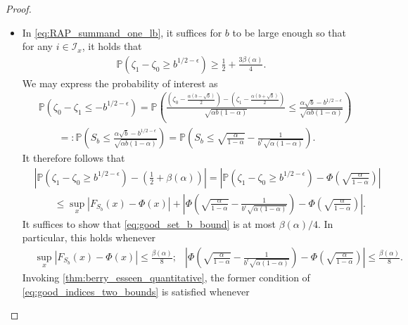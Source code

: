 \documentclass[11pt]{amsart}
\numberwithin{equation}{section}
\numberwithin{equation}{section}
\newcommand{\1}{\mathbbm{1}}
\newcommand{\Prob}{\mathbb{P}}
\theoremstyle{definition}
\begin{document}
\begin{appendices}
\begin{proof}
\begin{itemize}
        \item In \eqref{eq:RAP_summand_one_lb}, it suffices for $b$ to be large enough so that for any $i \in \mathcal I_x$, it holds that
        \begin{align*}
            \Prob\left( \zeta_1 - \zeta_0 \geq b^{1/2-\epsilon} \right) \geq \frac{1}{2} + \frac{3\beta(\alpha)}{4}.
        \end{align*}
        We may express the probability of interest as
        \begin{align*}
            & \Prob\left( \zeta_0 - \zeta_1 \leq -b^{1/2-\epsilon} \right) = \Prob\left( \frac{\left( \zeta_0-\frac{\alpha(b-\sqrt{b})}{2} \right) - \left( \zeta_1-\frac{\alpha(b+\sqrt{b})}{2} \right)}{\sqrt{\alpha b (1-\alpha)}} \leq \frac{\alpha \sqrt{b} - b^{1/2-\epsilon}}{\sqrt{\alpha b (1-\alpha)}} \right) \\
            & \qquad =: \Prob\left( S_b \leq \frac{\alpha \sqrt{b} - b^{1/2-\epsilon}}{\sqrt{\alpha b (1-\alpha)}} \right) = \Prob\left( S_b \leq \sqrt{\frac{\alpha}{1-\alpha}} - \frac{1}{b^\epsilon \sqrt{\alpha(1-\alpha)}} \right).
        \end{align*}
        It therefore follows that
        \begin{align}
            & \left| \Prob\left( \zeta_1 - \zeta_0 \geq b^{1/2-\epsilon} \right) - \left(\frac{1}{2} + \beta(\alpha) \right) \right| = \left| \Prob\left( \zeta_1 - \zeta_0 \geq b^{1/2-\epsilon} \right) - \Phi\left( \sqrt{\frac{\alpha}{1-\alpha}} \right) \right| \nonumber \\
            & \qquad \leq \sup_x |F_{S_b}(x) - \Phi(x)| + \left| \Phi\left( \sqrt{\frac{\alpha}{1-\alpha}} - \frac{1}{b^\epsilon \sqrt{\alpha(1-\alpha)}} \right) - \Phi\left( \sqrt{\frac{\alpha}{1-\alpha}} \right) \right|. \label{eq:good_set_b_bound}
        \end{align}
        It suffices to show that \eqref{eq:good_set_b_bound} is at most $\beta(\alpha)/4$. In particular, this holds whenever
        \begin{align} \label{eq:good_indices_two_bounds}
            & \sup_x |F_{S_b}(x) - \Phi(x)| \leq \frac{\beta(\alpha)}{8};
            & \left| \Phi\left( \sqrt{\frac{\alpha}{1-\alpha}} - \frac{1}{b^\epsilon \sqrt{\alpha (1-\alpha)}} \right) - \Phi\left( \sqrt{\frac{\alpha}{1-\alpha}} \right) \right| \leq \frac{\beta(\alpha)}{8}.
        \end{align}
        Invoking \cref{thm:berry_esseen_quantitative}, the former condition of \eqref{eq:good_indices_two_bounds} is satisfied whenever

\end{itemize}
\end{proof}
\end{appendices}
\end{document}
